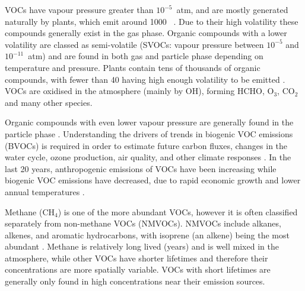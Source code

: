   
  VOCs have vapour pressure greater than $10^{-5}$~atm, and are mostly 
  generated naturally by plants, which emit around 1000\tgpyr 
  ~\parencite{Guenther1995, Glasius2016}.
  Due to their high volatility these compounds generally exist in the gas phase.
  Organic compounds with a lower volatility are classed as semi-volatile (SVOCs: vapour pressure between $10^{-5}$ and $10^{-11}$~atm) and are found in both gas and particle phase depending on temperature and pressure.
  Plants contain tens of thousands of organic compounds, with fewer than 40 having high enough volatility to be emitted \parencite{Guenther2000}.
  VOCs are oxidised in the atmosphere (mainly by OH), forming HCHO, O$_3$, 
  CO$_2$ and many other species.
  
  Organic compounds with even lower vapour pressure are generally found in the 
  particle phase \parencite{Glasius2016}.
  Understanding the drivers of trends in biogenic VOC emissions (BVOCs) is required in order to estimate future carbon fluxes, changes in the water cycle, ozone production, air quality, and other climate responses \parencite{Yue2015}.
  In the last 20 years, anthropogenic emissions of VOCs have been increasing while biogenic VOC emissions have decreased, due to rapid economic growth and lower annual temperatures \parencite{Stavrakou2014, Kwon2017}.
  
  Methane (CH$_4$) is one of the more abundant VOCs, however it is often 
  classified separately from non-methane VOCs (NMVOCs).
  NMVOCs include alkanes, alkenes, and aromatic hydrocarbons, with isoprene (an alkene) being the most abundant \parencite{Guenther1995}.
  Methane is relatively long lived (years) and is well mixed in the atmosphere, while other VOCs have shorter lifetimes and therefore their concentrations are more spatially variable.
  VOCs with short lifetimes are generally only found in high concentrations 
  near their emission sources.
  
  
  
  
